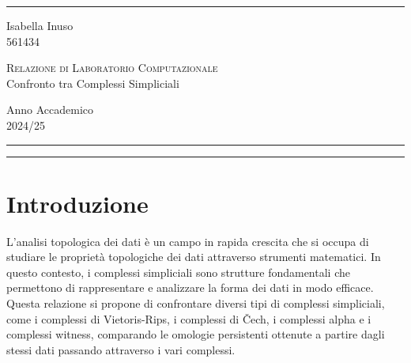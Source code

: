 \documentclass[a4paper, 12pt]{article}
\theoremstyle{definition}
\theoremstyle{remark}
\begin{document}
\vspace*{3.5cm}
\hrule \medskip \vspace{2pt} %
\begin{center}
\noindent \begin{minipage}{0.2\textwidth}
\centering
Isabella Inuso \hfill\\
561434\hfill\\
\end{minipage}
\begin{minipage}{0.5\textwidth}
    \centering
    \textsc{\footnotesize Relazione di Laboratorio Computazionale} \hfill\\
    \LARGE
    Confronto tra Complessi Simpliciali
\end{minipage}
\begin{minipage}{0.2\textwidth}
 \centering
 Anno Accademico\\
 2024/25\hfill\\
\end{minipage}
\end{center}
\bigskip \hrule
\hrule \medskip \vspace{6pt}
\bigskip

\newpage
\tableofcontents

\newpage

\hypersetup{pageanchor=true} %
\setcounter{page}{1}

\section{Introduzione}
L'analisi topologica dei dati è un campo in rapida crescita che si occupa di studiare le proprietà topologiche dei dati attraverso strumenti matematici. In questo contesto, i complessi simpliciali sono strutture fondamentali che permettono di rappresentare e analizzare la forma dei dati in modo efficace. Questa relazione si propone di confrontare diversi tipi di complessi simpliciali, come i complessi di Vietoris-Rips, i complessi di Čech, i complessi alpha e i complessi witness, comparando le omologie persistenti ottenute a partire dagli stessi dati passando attraverso i vari complessi.
\end{document}
